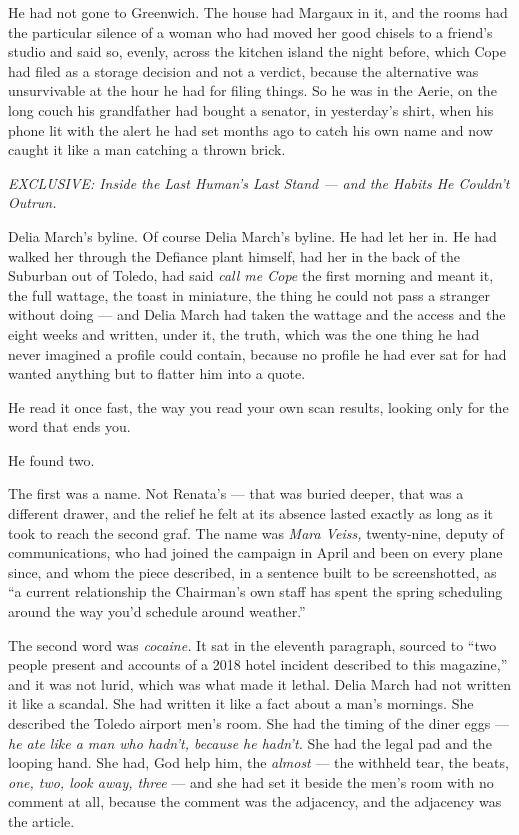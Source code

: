 \documentclass[11pt,openany]{book}
\begin{document}
He had not gone to Greenwich. The house had Margaux in it, and the rooms had the particular silence of a woman who had moved her good chisels to a friend's studio and said so, evenly, across the kitchen island the night before, which Cope had filed as a storage decision and not a verdict, because the alternative was unsurvivable at the hour he had for filing things. So he was in the Aerie, on the long couch his grandfather had bought a senator, in yesterday's shirt, when his phone lit with the alert he had set months ago to catch his own name and now caught it like a man catching a thrown brick.

\textit{EXCLUSIVE: Inside the Last Human's Last Stand --- and the Habits He Couldn't Outrun.}

Delia March's byline. Of course Delia March's byline. He had let her in. He had walked her through the Defiance plant himself, had her in the back of the Suburban out of Toledo, had said \textit{call me Cope} the first morning and meant it, the full wattage, the toast in miniature, the thing he could not pass a stranger without doing --- and Delia March had taken the wattage and the access and the eight weeks and written, under it, the truth, which was the one thing he had never imagined a profile could contain, because no profile he had ever sat for had wanted anything but to flatter him into a quote.

He read it once fast, the way you read your own scan results, looking only for the word that ends you.

He found two.

The first was a name. Not Renata's --- that was buried deeper, that was a different drawer, and the relief he felt at its absence lasted exactly as long as it took to reach the second graf. The name was \textit{Mara Veiss,} twenty-nine, deputy of communications, who had joined the campaign in April and been on every plane since, and whom the piece described, in a sentence built to be screenshotted, as ``a current relationship the Chairman's own staff has spent the spring scheduling around the way you'd schedule around weather.''

The second word was \textit{cocaine.} It sat in the eleventh paragraph, sourced to ``two people present and accounts of a 2018 hotel incident described to this magazine,'' and it was not lurid, which was what made it lethal. Delia March had not written it like a scandal. She had written it like a fact about a man's mornings. She described the Toledo airport men's room. She had the timing of the diner eggs --- \textit{he ate like a man who hadn't, because he hadn't.} She had the legal pad and the looping hand. She had, God help him, the \textit{almost} --- the withheld tear, the beats, \textit{one, two, look away, three} --- and she had set it beside the men's room with no comment at all, because the comment was the adjacency, and the adjacency was the article.
\end{document}
